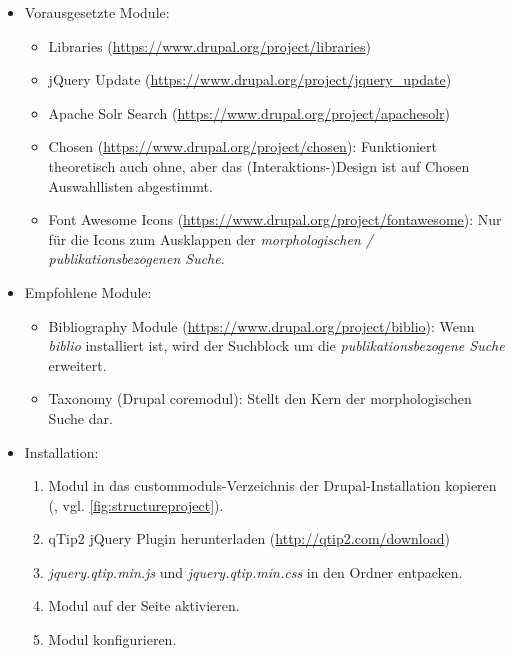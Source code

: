 \begin{itemize}[parsep=0pt, itemsep=5.0pt plus 2.0pt minus 1.0pt, leftmargin=*]
	\item Vorausgesetzte Module:
	\begin{itemize}
		\item Libraries (\url{https://www.drupal.org/project/libraries})
		\item jQuery Update (\url{https://www.drupal.org/project/jquery_update})
		\item Apache Solr Search (\url{https://www.drupal.org/project/apachesolr})
		\item Chosen (\url{https://www.drupal.org/project/chosen}): Funktioniert theoretisch auch ohne, aber das (Interaktions-)Design ist auf Chosen Auswahllisten abgestimmt.
		\item Font Awesome Icons (\url{https://www.drupal.org/project/fontawesome}): Nur für die Icons zum Ausklappen der \textit{morphologischen / publikationsbezogenen Suche}.
	\end{itemize}
	\newpage

	\item Empfohlene Module:
	\begin{itemize}
		\item Bibliography Module (\url{https://www.drupal.org/project/biblio}): Wenn \textit{biblio} installiert ist, wird der Suchblock um die \textit{publikationsbezogene Suche} erweitert.
		\item Taxonomy (Drupal \gls{coremodul}): Stellt den Kern der morphologischen Suche dar.
	\end{itemize}

	\item Installation:
	\begin{enumerate}
		\item Modul in das \glspl{custommodul}-Verzeichnis der Drupal-Installation kopieren  (\zB {}, vgl. \cref{fig:structureproject}).
		\item qTip2 jQuery Plugin herunterladen (\url{http://qtip2.com/download})
		\item \textit{jquery.qtip.min.js} und \textit{jquery.qtip.min.css} in den Ordner  entpacken.
		\item Modul auf der Seite  aktivieren.
		\item Modul konfigurieren.

	\end{enumerate}


\end{itemize}
